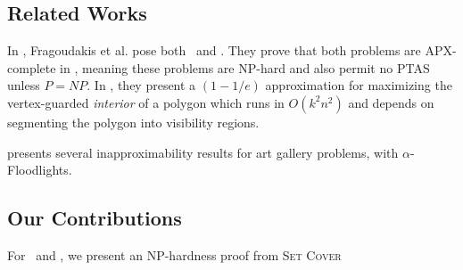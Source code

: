 \subsection{Related Works}
In \cite{fragoudakis-interior,fragoudakis-boundary,fragoudakis-paintings}, Fragoudakis et al. pose both \MLVG\ and \MVVG. They prove that both problems are APX-complete in \cite{fragoudakis-boundary}, meaning these problems are NP-hard and also permit no PTAS unless $P=NP$. In \cite{fragoudakis-interior}, they present a $(1-1/e)$ approximation for maximizing the vertex-guarded \emph{interior} of a polygon which runs in $O(k^2n^2)$ and depends on segmenting the polygon into visibility regions.

\cite{abdelkader} presents several inapproximability results for art gallery problems, with $\alpha$-Floodlights.


\cite{bukov}

\subsection{Our Contributions}
For \MLVG\ and \MVVG, we present an NP-hardness proof from \textsc{Set Cover}







